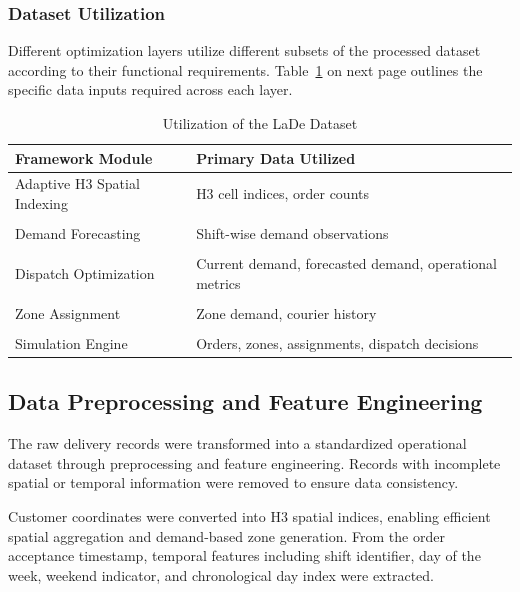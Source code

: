 \documentclass{article}
\begin{document}
\subsubsection{Dataset Utilization}
\label{subsubsec:dataset_utilization}

Different optimization layers utilize different subsets of the processed dataset according to their functional requirements. Table~\ref{tab:lade_utilization} on next page outlines the specific data inputs required across each layer.

\begin{table}[htbp]
\centering
\caption{Utilization of the LaDe Dataset}
\label{tab:lade_utilization}
\begin{tabularx}{0.65\textwidth}{>{\raggedright\arraybackslash}X >{\raggedright\arraybackslash}X}
\hline
\textbf{Framework Module} & \textbf{Primary Data Utilized} \\ 
\hline
Adaptive H3 Spatial Indexing & H3 cell indices, order counts \\ \\
Demand Forecasting & Shift-wise demand observations \\ \\
Dispatch Optimization & Current demand, forecasted demand, operational metrics \\ \\
Zone Assignment & Zone demand, courier history \\ \\
Simulation Engine & Orders, zones, assignments, dispatch decisions \\
\hline
\end{tabularx}
\end{table}

\subsection{Data Preprocessing and Feature Engineering}
\label{subsec:data_preprocessing_and_feature_engineering}

The raw delivery records were transformed into a standardized operational dataset through preprocessing and feature engineering. Records with incomplete spatial or temporal information were removed to ensure data consistency.

Customer coordinates were converted into H3 spatial indices, enabling efficient spatial aggregation and demand-based zone generation. From the order acceptance timestamp, temporal features including shift identifier, day of the week, weekend indicator, and chronological day index were extracted.
\end{document}
